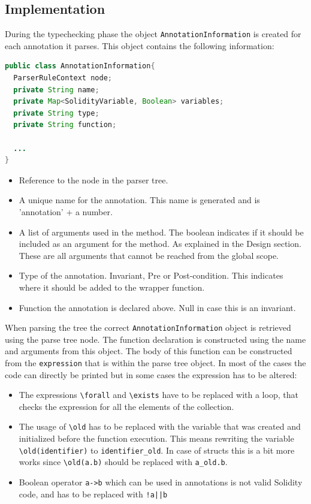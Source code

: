 \documentclass[a4paper]{article}
\begin{document}
\subsection{Implementation}
During the typechecking phase the object \texttt{AnnotationInformation} is created for each annotation it parses. This object contains the following information:
\begin{lstlisting}[breaklines=true, language=Java ]
public class AnnotationInformation{  
  ParserRuleContext node;
  private String name;
  private Map<SolidityVariable, Boolean> variables;
  private String type;
  private String function;

  ...
}
\end{lstlisting}
\begin{itemize}
  \item Reference to the node in the parser tree.
  \item A unique name for the annotation. This name is generated and is 'annotation' + a number.
  \item A list of arguments used in the method. The boolean indicates if it should be included as an argument for the method. As explained in the Design section. These are all arguments that cannot be reached from the global scope.
  \item Type of the annotation. Invariant, Pre or Post-condition. This indicates where it should be added to the wrapper function.
  \item Function the annotation is declared above. Null in case this is an invariant.
\end{itemize}
When parsing the tree the correct \texttt{AnnotationInformation} object is retrieved using the parse tree node. The function declaration is constructed using the name and arguments from this object. The body of this function can be constructed from the \texttt{expression} that is within the parse tree object. In most of the cases the code can directly be printed but in some cases the expression has to be altered:
\begin{itemize}
  \item The expressions \texttt{\textbackslash forall} and \texttt{\textbackslash exists} have to be replaced with a loop, that checks the expression for all the elements of the collection. 
  \item The usage of \texttt{\textbackslash old} has to be replaced with the variable that was created and initialized before the function execution. This means rewriting the variable \texttt{\textbackslash old(identifier)} to \texttt{identifier\_old}. In case of structs this is a bit more works since \texttt{\textbackslash old(a.b)} should be replaced with \texttt{a\_old.b}.
  \item Boolean operator \texttt{a->b} which can be used in annotations is not valid Solidity code, and has to be replaced with \texttt{!a||b}
\end{itemize}
\end{document}
